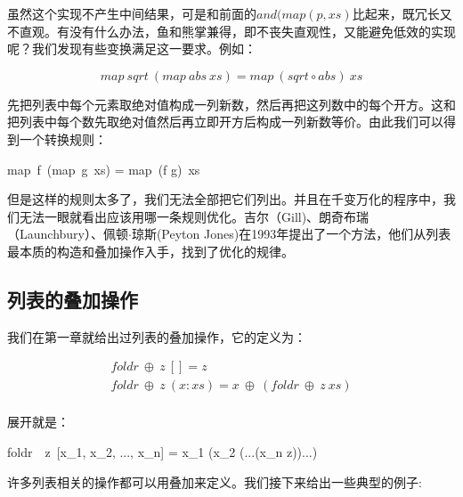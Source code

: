 \documentclass{article}
\begin{document}
虽然这个实现不产生中间结果，可是和前面的$and(map(p, xs)$比起来，既冗长又不直观。有没有什么办法，鱼和熊掌兼得，即不丧失直观性，又能避免低效的实现呢？我们发现有些变换满足这一要求。例如：

\[
map\ sqrt\  (map\ abs\ xs) = map\ (sqrt \circ abs)\ xs
\]

先把列表中每个元素取绝对值构成一列新数，然后再把这列数中的每个开方。这和把列表中每个数先取绝对值然后再立即开方后构成一列新数等价。由此我们可以得到一个转换规则：

\be
map\ f\ (map\ g\ xs) = map\ (f \circ g)\ xs
\ee

但是这样的规则太多了，我们无法全部把它们列出。并且在千变万化的程序中，我们无法一眼就看出应该用哪一条规则优化。吉尔（Gill)、朗奇布瑞（Launchbury）、佩顿$\cdot$琼斯(Peyton Jones)在1993年提出了一个方法，他们从列表最本质的构造和叠加操作入手，找到了优化的规律。

\subsection{列表的叠加操作}

我们在第一章就给出过列表的叠加操作，它的定义为：

\[
\begin{array}{l}
foldr\ \oplus\ z\ [] = z \\
foldr\ \oplus\ z\ (x:xs) = x\ \oplus\ (foldr\ \oplus\ z\ xs) \\
\end{array}
\]

展开就是：

\be
foldr\ \oplus\ z\ [x_1, x_2, ..., x_n] = x_1 \oplus (x_2 \oplus (...(x_n \oplus z))...)
\ee

许多列表相关的操作都可以用叠加来定义。我们接下来给出一些典型的例子:
\end{document}
